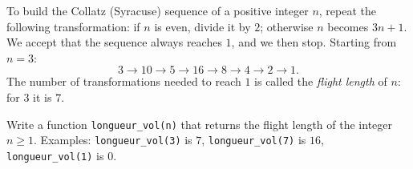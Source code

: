 To build the Collatz (Syracuse) sequence of a positive integer $n$, repeat the following transformation: if $n$ is even, divide it by $2$; otherwise $n$ becomes $3n + 1$. We accept that the sequence always reaches $1$, and we then stop. Starting from $n = 3$:
\[3 \to 10 \to 5 \to 16 \to 8 \to 4 \to 2 \to 1.\]
The number of transformations needed to reach $1$ is called the \emph{flight length} of $n$: for $3$ it is $7$.

Write a function \texttt{longueur\_vol(n)} that returns the flight length of the integer $n \ge 1$. Examples: \texttt{longueur\_vol(3)} is $7$, \texttt{longueur\_vol(7)} is $16$, \texttt{longueur\_vol(1)} is $0$.
